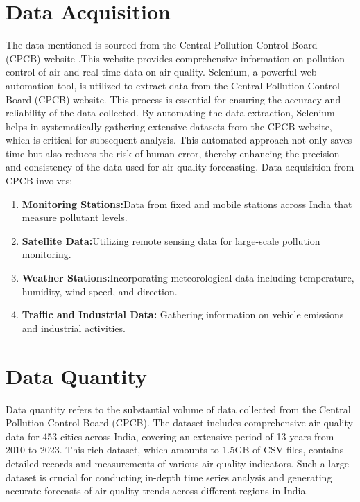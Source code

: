 \section{Data Acquisition}

The data mentioned is sourced from the Central Pollution Control Board (CPCB) website \cite{CPCB:2023}.This website provides comprehensive information on pollution control of air and real-time data on air quality. Selenium, a powerful web automation tool, is utilized to extract data from the Central Pollution Control Board (CPCB) website. This process is essential for ensuring the accuracy and reliability of the data collected. By automating the data extraction, Selenium helps in systematically gathering extensive datasets from the CPCB website, which is critical for subsequent analysis. This automated approach not only saves time but also reduces the risk of human error, thereby enhancing the precision and consistency of the data used for air quality forecasting. Data acquisition from CPCB involves: 
\begin{enumerate}
	
	\item \textbf{Monitoring Stations:}Data from fixed and mobile stations across India that measure pollutant levels.
	\item \textbf{Satellite Data:}Utilizing remote sensing data for large-scale pollution monitoring. 
	\item \textbf{Weather Stations:}Incorporating meteorological data including temperature, humidity, wind speed, and direction.
	\item \textbf{Traffic and Industrial Data:} Gathering information on vehicle emissions and industrial activities.
\end{enumerate}

\section{Data Quantity}
 Data quantity refers to the substantial volume of data collected from the Central Pollution Control Board (CPCB). The dataset includes comprehensive air quality data for 453 cities across India, covering an extensive period of 13 years from 2010 to 2023. This rich dataset, which amounts to 1.5GB of CSV files, contains detailed records and measurements of various air quality indicators. Such a large dataset is crucial for conducting in-depth time series analysis and generating accurate forecasts of air quality trends across different regions in India.
 
